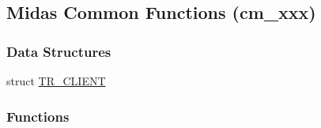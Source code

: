 \subsection{Midas Common Functions (cm\_\-xxx)}
\label{group__cmfunctionc}
\subsubsection*{Data Structures}
\begin{DoxyCompactItemize}
\item 
struct \hyperlink{structTR__CLIENT}{TR\_\-CLIENT}
\end{DoxyCompactItemize}
\subsubsection*{Functions}
